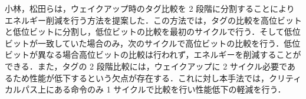 小林，松田らは，ウェイクアップ時のタグ比較を 2 段階に分割することによりエネルギー削減を行う方法を提案した\cite{kobayashi-thesis, matsuda-thesis}．この方法では，タグの比較を高位ビットと低位ビットに分割し，低位ビットの比較を最初のサイクルで行う．そして低位ビットが一致していた場合のみ，次のサイクルで高位ビットの比較を行う．低位ビットが異なる場合高位ビットの比較は行われず，エネルギーを削減することができる．また，タグの 2 段階比較には，ウェイクアップに 2 サイクル必要であるため性能が低下するという欠点が存在する．これに対し本手法では，クリティカルパス上にある命令のみ 1 サイクルで比較を行い性能低下の軽減を行う．

